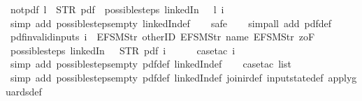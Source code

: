 \begin{isabellebody}
\isanewline
{}\isamarkupfalse%
\ not{\isacharunderscore}pdf{\isacharunderscore}{}{\isacharcolon}\ {\isachardoublequoteopen}l\ {\isasymnoteq}\ STR\ {\isacharprime}{\isacharprime}pdf{\isacharprime}{\isacharprime}\ {\isasymLongrightarrow}\ possible{\isacharunderscore}steps\ linkedIn\ {}\ {\isacharless}{\isachargreater}\ l\ i\ {\isacharequal}\ {\isacharbraceleft}{\isacharbar}{\isacharbar}{\isacharbraceright}{\isachardoublequoteclose}\isanewline
%
\isadelimproof
\ \ %
\endisadelimproof
%
\isatagproof
{}\isamarkupfalse%
\ {\isacharparenleft}simp\ add{\isacharcolon}\ possible{\isacharunderscore}steps{\isacharunderscore}empty\ linkedIn{\isacharunderscore}def{\isacharparenright}\isanewline
\ \ \isamarkupfalse%
\ safe\isanewline
\ \ \isamarkupfalse%
\ {\isacharparenleft}simp{\isacharunderscore}all\ add{\isacharcolon}\ pdf{}{\isacharunderscore}def{\isacharparenright}%
\endisatagproof
{\isafoldproof}%
%
\isadelimproof
\isanewline
%
\endisadelimproof
\isanewline
{}\isamarkupfalse%
\ pdf{\isacharunderscore}{}{\isacharunderscore}invalid{\isacharunderscore}inputs{\isacharcolon}\ {\isachardoublequoteopen}i\ {\isasymnoteq}\ {\isacharbrackleft}EFSM{\isachardot}Str\ {\isacharprime}{\isacharprime}otherID{\isacharprime}{\isacharprime}{\isacharcomma}\ EFSM{\isachardot}Str\ {\isacharprime}{\isacharprime}name{\isacharprime}{\isacharprime}{\isacharcomma}\ EFSM{\isachardot}Str\ {\isacharprime}{\isacharprime}{}zoF{\isacharprime}{\isacharprime}{\isacharbrackright}\ {\isasymLongrightarrow}\isanewline
\ possible{\isacharunderscore}steps\ linkedIn\ {}\ {\isacharless}{\isachargreater}\ STR\ {\isacharprime}{\isacharprime}pdf{\isacharprime}{\isacharprime}\ i\ {\isacharequal}\ {\isacharbraceleft}{\isacharbar}{\isacharbar}{\isacharbraceright}{\isachardoublequoteclose}\isanewline
%
\isadelimproof
\ \ %
\endisadelimproof
%
\isatagproof
{}\isamarkupfalse%
\ {\isacharparenleft}case{\isacharunderscore}tac\ i{\isacharparenright}\isanewline
\ \ \ \isamarkupfalse%
\ {\isacharparenleft}simp\ add{\isacharcolon}\ possible{\isacharunderscore}steps{\isacharunderscore}empty\ pdf{}{\isacharunderscore}def\ linkedIn{\isacharunderscore}def{\isacharparenright}\isanewline
\ \ \isamarkupfalse%
\ {\isacharparenleft}case{\isacharunderscore}tac\ list{\isacharparenright}\isanewline
\ \ \ \isamarkupfalse%
\ {\isacharparenleft}simp\ add{\isacharcolon}\ possible{\isacharunderscore}steps{\isacharunderscore}empty\ pdf{}{\isacharunderscore}def\ linkedIn{\isacharunderscore}def\ join{\isacharunderscore}ir{\isacharunderscore}def\ input{}state{\isacharunderscore}def\ apply{\isacharunderscore}guards{\isacharunderscore}def{\isacharparenright}\isanewline

\end{isabellebody}
